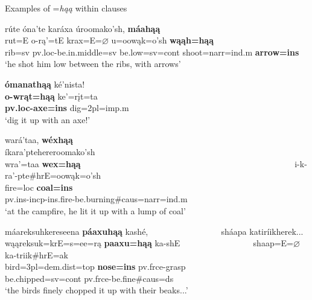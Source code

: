 \begin{exe}
\item\label{MoreExamplesOfInstrumentalHaa} Examples of =\textit{hąą} within clauses

\begin{xlist}

\item\label{MoreExamplesOfInstrumentalHaa1} \glll rúte óna'te karáxa úroomako'sh, \textbf{máahąą}\\
    rut=E o-rą'=tE krax=E=$\varnothing$ u=oowąk=o'sh \textbf{wąąh=hąą}\\
    \textnormal{rib}=sv pv.loc-\textnormal{be.in.middle}=sv \textnormal{be.low}=sv=cont \textnormal{shoot}=narr=ind.m \textbf{\textnormal{\bfseries arrow}=ins}\\
    \glt `he shot him low between the ribs, with arrows' \citep[41]{hollow1973b}

\item\label{MoreExamplesOfInstrumentalHaa2} \glll \textbf{ómanathąą} ké'nista!\\
    \textbf{o-wrąt=hąą} ke'=rįt=ta\\
    \textbf{pv.loc-\textnormal{\bfseries axe}=ins} \textnormal{dig}=2pl=imp.m\\
    \glt `dig it up with an axe!' \citep[151]{hollow1973b}
    
\item\label{MoreExamplesOfInstrumentalHaa3} \glll wará'taa, \textbf{wéxhąą} ~ ~ ~ ~ ~ ~ ~ ~ ~ ~ ~ ~ ~ ~ ~ ~ ~ ~ ~ ~ ~ ~ ~ ~ ~ ~ ~ ~ ~ ~  íkara'ptehereroomako'sh\\
    wra'=taa \textbf{wex=hąą} ~ ~ ~ ~ ~ ~ ~ ~ ~ ~ ~ ~ ~ ~ ~ ~ ~ ~ ~ ~ ~ ~ ~ ~ ~ ~ ~ ~ ~ ~  i-k-ra'-pte\#hrE=oowąk=o'sh\\
    \textnormal{fire}=loc \textbf{\textnormal{\bfseries coal}=ins} ~ ~ ~ ~ ~ ~ ~ ~ ~ ~ ~ ~ ~ ~ ~ ~ ~ ~ ~ ~ ~ ~ ~ ~ ~ ~ ~ ~ ~ ~  pv.ins-incp-ins.fire-\textnormal{be.burning}\#caus=narr=ind.m\\
    \glt `at the campfire, he lit it up with a lump of coal' \citep[185]{hollow1973b}

\item\label{MoreExamplesOfInstrumentalHaa4} \glll máareksuhkereseena \textbf{páaxuhąą} kashé, ~ ~ ~ ~ ~ ~ ~ ~ ~ ~ sháapa katiríikherek...\\
    wąąreksuk=krE=s=ee=rą \textbf{paaxu=hąą} ka-shE ~ ~ ~ ~ ~ ~ ~ ~ ~ ~ shaap=E=$\varnothing$ ka-triik\#hrE=ak\\
    \textnormal{bird}=3pl=dem.dist=top \textbf{\textnormal{\bfseries nose}=ins} pv.frce-\textnormal{grasp} ~ ~ ~ ~ ~ ~ ~ ~ ~ ~  \textnormal{be.chipped}=sv=cont pv.frce-\textnormal{be.fine}\#caus=ds\\
    \glt `the birds finely chopped it up with their beaks...' \citep[18]{hollow1973a}
    

\end{xlist}
\end{exe}
